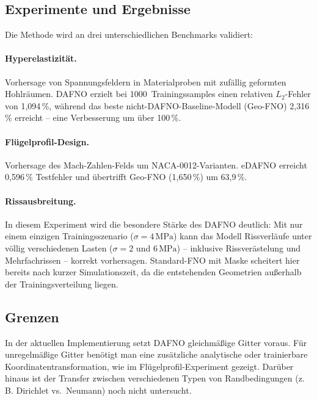 \documentclass[a4paper,12pt]{article}
\begin{document}
\subsection*{Experimente und Ergebnisse}

Die Methode wird an drei unterschiedlichen Benchmarks validiert:

\paragraph{Hyperelastizit\"at.}
Vorhersage von Spannungsfeldern in Materialproben mit zuf\"allig geformten
Hohlr\"aumen. DAFNO erzielt bei 1000~Trainingssamples einen relativen
$L_2$-Fehler von 1,094\,\%, w\"ahrend das beste nicht-DAFNO-Baseline-Modell
(Geo-FNO) 2,316\,\% erreicht -- eine Verbesserung um \"uber 100\,\%.

\paragraph{Fl\"ugelprofil-Design.}
Vorhersage des Mach-Zahlen-Felds um NACA-0012-Varianten. eDAFNO erreicht
0,596\,\% Testfehler und \"ubertrifft Geo-FNO (1,650\,\%) um 63,9\,\%.

\paragraph{Rissausbreitung.}
In diesem Experiment wird die besondere St\"arke des DAFNO deutlich:
Mit nur einem einzigen Trainingsszenario ($\sigma = 4\,\mathrm{MPa}$) kann
das Modell Rissverl\"aufe unter v\"ollig verschiedenen Lasten ($\sigma = 2$ und
$6\,\mathrm{MPa}$) -- inklusive Rissver\"astelung und Mehrfachrissen -- korrekt
vorhersagen. Standard-FNO mit Maske scheitert hier bereits nach kurzer Simulationszeit,
da die entstehenden Geometrien au\ss{}erhalb der Trainingsverteilung liegen.

\subsection*{Grenzen}

In der aktuellen Implementierung setzt DAFNO gleichm\"a\ss{}ige Gitter voraus.
F\"ur unregelm\"a\ss{}ige Gitter ben\"otigt man eine zus\"atzliche analytische
oder trainierbare Koordinatentransformation, wie im Fl\"ugelprofil-Experiment
gezeigt. Dar\"uber hinaus ist der Transfer zwischen verschiedenen Typen von
Randbedingungen (z.\,B. Dirichlet vs.\ Neumann) noch nicht untersucht.
\end{document}
